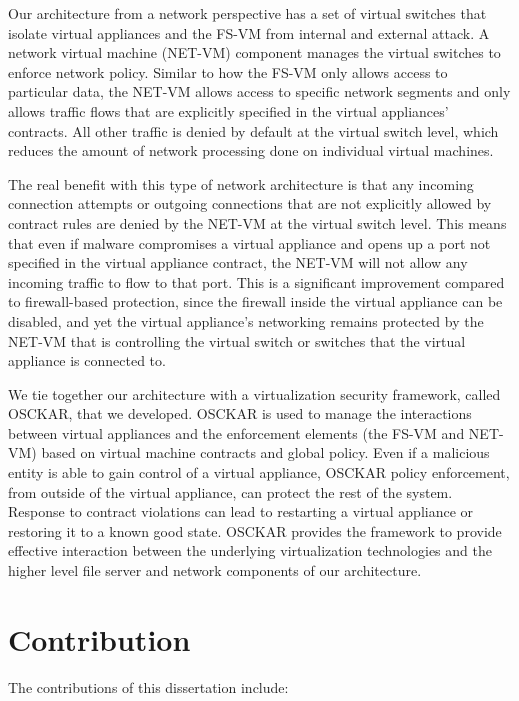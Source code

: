 Our architecture from a network perspective has a set of virtual switches that isolate virtual appliances and the FS-VM from internal and external attack. A network virtual machine (NET-VM) component manages the virtual switches to enforce network policy. Similar to how the FS-VM only allows access to particular data, the NET-VM allows access to specific network segments and only allows traffic flows that are explicitly specified in the virtual appliances' contracts. All other traffic is denied by default at the virtual switch level, which reduces the amount of network processing done on individual virtual machines.

The real benefit with this type of network architecture is that any incoming connection attempts or outgoing connections that are not explicitly allowed by contract rules are denied by the NET-VM at the virtual switch level. This means that even if malware compromises a virtual appliance and opens up a port not specified in the virtual appliance contract, the NET-VM will not allow any incoming traffic to flow to that port. This is a significant improvement compared to firewall-based protection, since the firewall inside the virtual appliance can be disabled, and yet the virtual appliance's networking remains protected by the NET-VM that is controlling the virtual switch or switches that the virtual appliance is connected to. 

We tie together our architecture with a virtualization security framework, called OSCKAR, that we developed. OSCKAR is used to manage the interactions between virtual appliances and the enforcement elements (the FS-VM and NET-VM) based on virtual machine contracts and global policy. Even if a malicious entity is able to gain control of a virtual appliance, OSCKAR policy enforcement, from outside of the virtual appliance, can protect the rest of the system. Response to contract violations can lead to restarting a virtual appliance or restoring it to a known good state. OSCKAR provides the framework to provide effective interaction between the underlying virtualization technologies and the higher level file server and network components of our architecture.

\section{Contribution}

The contributions of this dissertation include:

